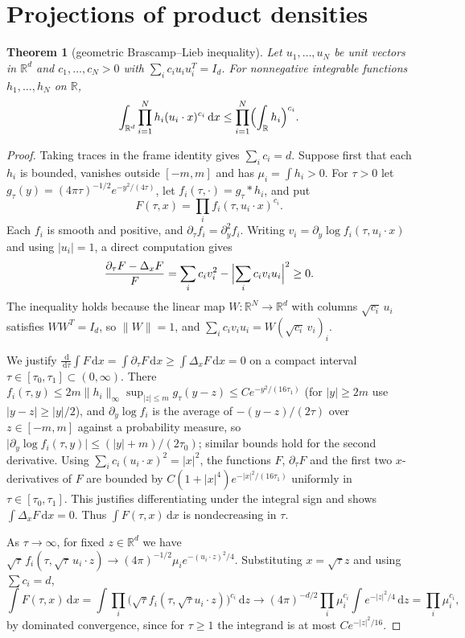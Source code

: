 \documentclass[11pt]{amsart}
\numberwithin{equation}{section}
\newtheorem{theorem}{Theorem}[section]
\theoremstyle{definition}
\theoremstyle{remark}
\newcommand{\R}{\mathbb R}
\newcommand{\1}{\mathbf 1}
\newcommand{\dd}{\,\mathrm d}
\newcommand{\norm}[1]{\lVert #1\rVert}
\newcommand{\abs}[1]{\lvert #1\rvert}
\begin{document}
\section{Projections of product densities}\label{sec:proj}

\begin{theorem}[geometric Brascamp--Lieb inequality]\label{thm:bl}
Let $u_1,\dots,u_N$ be unit vectors in $\R^d$ and $c_1,\dots,c_N>0$ with $\sum_ic_iu_iu_i^T=I_d$. For nonnegative integrable functions $h_1,\dots,h_N$ on $\R$,
\[
\int_{\R^d}\prod_{i=1}^Nh_i(u_i\cdot x)^{c_i}\dd x\le\prod_{i=1}^N\Bigl(\int_\R h_i\Bigr)^{c_i}.
\]
\end{theorem}

\begin{proof}
Taking traces in the frame identity gives $\sum_ic_i=d$. Suppose first that each $h_i$ is bounded, vanishes outside $[-m,m]$ and has $\mu_i=\int h_i>0$. For $\tau>0$ let $g_\tau(y)=(4\pi\tau)^{-1/2}e^{-y^2/(4\tau)}$, let $f_i(\tau,\cdot)=g_\tau*h_i$, and put
\[
F(\tau,x)=\prod_i f_i(\tau,u_i\cdot x)^{c_i}.
\]
Each $f_i$ is smooth and positive, and $\partial_\tau f_i=\partial_y^2f_i$. Writing $v_i=\partial_y\log f_i(\tau,u_i\cdot x)$ and using $\abs{u_i}=1$, a direct computation gives
\[
\frac{\partial_\tau F-\Delta_xF}{F}=\sum_ic_iv_i^2-\Bigl\lvert\sum_ic_iv_iu_i\Bigr\rvert^2\ge0 .
\]
The inequality holds because the linear map $W:\R^N\to\R^d$ with columns $\sqrt{c_i}\,u_i$ satisfies $WW^T=I_d$, so $\norm W=1$, and $\sum_ic_iv_iu_i=W(\sqrt{c_i}\,v_i)_i$.

We justify $\frac{\dd}{\dd\tau}\int F\dd x=\int\partial_\tau F\dd x\ge\int\Delta_xF\dd x=0$ on a compact interval $\tau\in[\tau_0,\tau_1]\subset(0,\infty)$. There $f_i(\tau,y)\le2m\norm{h_i}_\infty\sup_{\abs z\le m}g_\tau(y-z)\le Ce^{-y^2/(16\tau_1)}$ (for $\abs y\ge2m$ use $\abs{y-z}\ge\abs y/2$), and $\partial_y\log f_i$ is the average of $-(y-z)/(2\tau)$ over $z\in[-m,m]$ against a probability measure, so $\abs{\partial_y\log f_i(\tau,y)}\le(\abs y+m)/(2\tau_0)$; similar bounds hold for the second derivative. Using $\sum_ic_i(u_i\cdot x)^2=\abs x^2$, the functions $F$, $\partial_\tau F$ and the first two $x$-derivatives of $F$ are bounded by $C(1+\abs x^4)e^{-\abs x^2/(16\tau_1)}$ uniformly in $\tau\in[\tau_0,\tau_1]$. This justifies differentiating under the integral sign and shows $\int\Delta_xF\dd x=0$. Thus $\int F(\tau,x)\dd x$ is nondecreasing in $\tau$.

As $\tau\to\infty$, for fixed $z\in\R^d$ we have $\sqrt\tau\,f_i(\tau,\sqrt\tau\,u_i\cdot z)\to(4\pi)^{-1/2}\mu_ie^{-(u_i\cdot z)^2/4}$. Substituting $x=\sqrt\tau z$ and using $\sum c_i=d$,
\[
\int F(\tau,x)\dd x=\int\prod_i\bigl(\sqrt\tau f_i(\tau,\sqrt\tau u_i\cdot z)\bigr)^{c_i}\dd z\longrightarrow(4\pi)^{-d/2}\prod_i\mu_i^{c_i}\int e^{-\abs z^2/4}\dd z=\prod_i\mu_i^{c_i},
\]
by dominated convergence, since for $\tau\ge1$ the integrand is at most $Ce^{-\abs z^2/16}$.


\end{proof}
\end{document}
